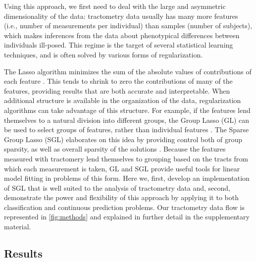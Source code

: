 \documentclass[10pt,%
               aps,%
               prl,%
               reprint,%
               superscriptaddress,%
               preprintnumbers,%
               linenumbers,%
               amsmath,%
               floatfix]{revtex4-1}
\begin{document}
Using this approach, we first need to deal with the large and
asymmetric dimensionality of the data: tractometry data usually has
many more features (i.e., number of measurements per individual) than
samples (number of subjects), which makes inferences from the data
about phenotypical differences between individuals ill-posed. This
regime is the target of several statistical learning techniques, and
is often solved by various forms of regularization.


The Lasso algorithm minimizes the sum of the absolute values of
contributions of each feature \cite{Tibshirani1996-qs}. This
tends to shrink to zero the contributions of many of the features,
providing results that are both accurate and interpretable. When
additional structure is available in the organization of the data,
regularization algorithms can take advantage of this structure. For
example, if the features lend themselves to a natural division into
different groups, the Group Lasso (GL) can be used to select groups
of features, rather than individual features \cite{Yuan2006-ky}.
The Sparse Group Lasso (SGL) elaborates on this idea by providing
control both of group sparsity, as well as overall sparsity of the
solutions \cite{simon2013sgl}. Because the features measured with
tractomery lend themselves to grouping based on the tracts from which
each measurement is taken, GL and SGL provide useful tools
for linear model fitting in problems of this form. Here we, first,
develop an implementation of SGL that is well suited to the analysis of
tractometry data and, second, demonstrate the power and flexibility of
this approach by applying it to both classification
and continuous prediction problems. Our tractometry data flow is
represented in \cref{fig:methods} and explained in further detail in
the supplementary material.

\subsection*{Results}
\end{document}
